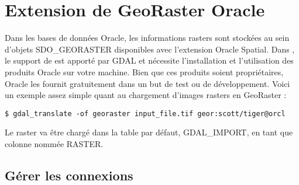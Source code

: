 \section{Extension de GeoRaster Oracle}\label{sec:oracleraster}


Dans les bases de données Oracle, les informations rasters sont stockées au sein d'objets SDO\_GEORASTER disponibles avec l'extension Oracle Spatial. Dans \qg, le support de  est apporté par GDAL et nécessite l'installation et l'utilisation des produits Oracle sur votre machine. Bien que ces produits soient propriétaires, Oracle les fournit gratuitement dans un but de test ou de développement. Voici un exemple assez simple quant au chargement d'images rasters en GeoRaster :

\begin{verbatim} 
$ gdal_translate -of georaster input_file.tif geor:scott/tiger@orcl
\end{verbatim}

Le raster va être chargé dans la table par défaut, GDAL\_IMPORT, en tant que colonne nommée RASTER.

\subsection{Gérer les connexions}


